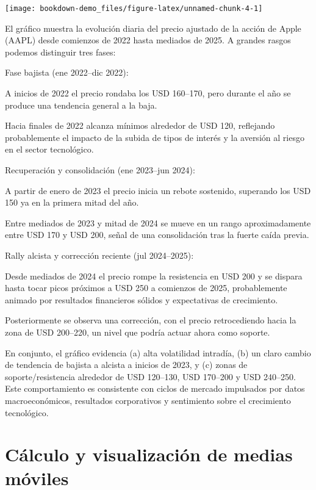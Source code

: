 \documentclass[
  11pt,
]{book}
\begin{document}
\begin{center}\texttt{[image: bookdown-demo\_files/figure-latex/unnamed-chunk-4-1]} \end{center}

El gráfico muestra la evolución diaria del precio ajustado de la acción de Apple (AAPL) desde comienzos de 2022 hasta mediados de 2025. A grandes rasgos podemos distinguir tres fases:

Fase bajista (ene 2022--dic 2022):

A inicios de 2022 el precio rondaba los USD 160--170, pero durante el año se produce una tendencia general a la baja.

Hacia finales de 2022 alcanza mínimos alrededor de USD 120, reflejando probablemente el impacto de la subida de tipos de interés y la aversión al riesgo en el sector tecnológico.

Recuperación y consolidación (ene 2023--jun 2024):

A partir de enero de 2023 el precio inicia un rebote sostenido, superando los USD 150 ya en la primera mitad del año.

Entre mediados de 2023 y mitad de 2024 se mueve en un rango aproximadamente entre USD 170 y USD 200, señal de una consolidación tras la fuerte caída previa.

Rally alcista y corrección reciente (jul 2024--2025):

Desde mediados de 2024 el precio rompe la resistencia en USD 200 y se dispara hasta tocar picos próximos a USD 250 a comienzos de 2025, probablemente animado por resultados financieros sólidos y expectativas de crecimiento.

Posteriormente se observa una corrección, con el precio retrocediendo hacia la zona de USD 200--220, un nivel que podría actuar ahora como soporte.

En conjunto, el gráfico evidencia (a) alta volatilidad intradía, (b) un claro cambio de tendencia de bajista a alcista a inicios de 2023, y (c) zonas de soporte/resistencia alrededor de USD 120--130, USD 170--200 y USD 240--250. Este comportamiento es consistente con ciclos de mercado impulsados por datos macroeconómicos, resultados corporativos y sentimiento sobre el crecimiento tecnológico.

\section{Cálculo y visualización de medias móviles}\label{cuxe1lculo-y-visualizaciuxf3n-de-medias-muxf3viles}
\end{document}
